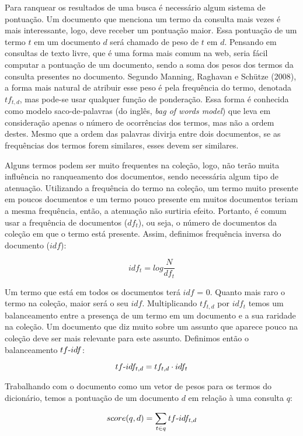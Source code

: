 Para ranquear os resultados de uma busca é necessário algum sistema de pontuação. Um documento que menciona um termo da consulta mais vezes é mais interessante, logo, deve receber um pontuação maior. Essa pontuação de um termo $t$ em um documento $d$ será chamado de peso de $t$ em $d$. Pensando em consultas de texto livre, que é uma forma mais comum na web, seria fácil computar a pontuação de um documento, sendo a soma dos pesos dos termos da consulta presentes no documento. Segundo Manning, Raghavan e Schütze (2008), a forma mais natural de atribuir esse peso é pela frequência do termo, denotada $tf_{t,d}$, mas pode-se usar qualquer função de ponderação. Essa forma é conhecida como modelo saco-de-palavras (do inglês, \emph{bag of words model}) que leva em consideração apenas o número de ocorrências dos termos, mas não a ordem destes. Mesmo que a ordem das palavras divirja entre dois documentos, se as frequências dos termos forem similares, esses devem ser similares.

Alguns termos podem ser muito frequentes na coleção, logo, não terão muita influência no ranqueamento dos documentos, sendo necessária algum tipo de atenuação. Utilizando a frequência do termo na coleção, um termo muito presente em poucos documentos e um termo pouco presente em muitos documentos teriam a mesma frequência, então, a atenuação não surtiria efeito. Portanto, é comum usar a frequência de documentos ($df_{t}$), ou seja, o número de documentos da coleção em que o termo está presente. Assim, definimos frequência inversa do documento ($idf$):

$$idf_{t} = log \frac{N}{df_{t}}$$

Um termo que está em todos os documentos terá $idf$ = 0. Quanto mais raro o termo na coleção, maior será o seu $idf$. Multiplicando $tf_{t,d}$ por $idf_{t}$ temos um balanceamento entre a presença de um termo em um documento e a sua raridade na coleção. Um documento que diz muito sobre um assunto que aparece pouco na coleção deve ser mais relevante para este assunto. Definimos então o balanceamento $tf\textnormal{-}idf$:

$$tf\textnormal{-}idf_{t,d} = tf_{t,d} \cdot idf_{t}$$

Trabalhando com o documento como um vetor de pesos para os termos do dicionário, temos a pontuação de um documento $d$ em relação à uma consulta $q$:

\begin{displaymath}
score(q,d) = \sum_{t \in q} tf\textnormal{-}idf_{t,d}
\end{displaymath}

